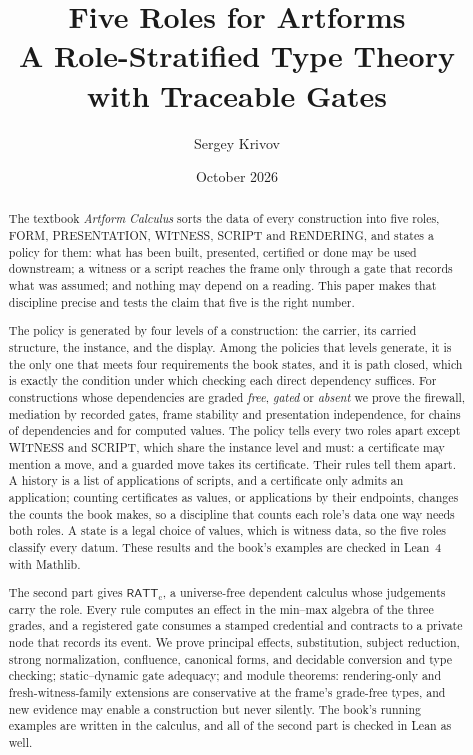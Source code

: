 \documentclass[11pt]{article}
\title{\textbf{Five Roles for Artforms}\\[4pt]
\large A Role-Stratified Type Theory with Traceable Gates}
\author{Sergey Krivov}
\date{October 2026}
\numberwithin{equation}{section}
\theoremstyle{definition}
\theoremstyle{plain}
\theoremstyle{remark}
\newcommand{\RATT}{\mathsf{RATT}_{\mathrm c}}
\newcommand{\FORM}{\textsf{FORM}}
\newcommand{\PRES}{\textsf{PRESENTATION}}
\newcommand{\WIT}{\textsf{WITNESS}}
\newcommand{\SCR}{\textsf{SCRIPT}}
\newcommand{\REN}{\textsf{RENDERING}}
\begin{document}
\maketitle

\begin{abstract}
The textbook \emph{Artform Calculus} sorts the data of every construction
into five roles, \FORM, \PRES, \WIT, \SCR{} and \REN, and states a policy for
them: what has been built, presented, certified or done may be used
downstream; a witness or a script reaches the frame only through a gate that
records what was assumed; and nothing may depend on a reading.  This paper
makes that discipline precise and tests the claim that five is the right
number.

The policy is generated by four levels of a construction: the carrier, its
carried structure, the instance, and the display.  Among the policies that
levels generate, it is the only one that meets four requirements the book
states, and it is path closed, which is
exactly the condition under which checking each direct dependency suffices.
For constructions whose dependencies are graded \emph{free}, \emph{gated} or
\emph{absent} we prove the firewall, mediation by recorded gates, frame
stability and presentation independence, for chains of dependencies and for
computed values.  The policy tells every two roles apart except \WIT{} and
\SCR, which share the instance level and must: a certificate may mention a
move, and a guarded move takes its certificate.  Their rules tell them apart.
A history is a list of applications of scripts, and a certificate only admits
an application; counting certificates as values, or applications by their
endpoints, changes the counts the book makes, so a discipline that counts
each role's data one way needs both roles.  A state is a legal choice of
values, which is witness data, so the five roles classify every datum.  These
results and the book's examples are checked in Lean~4 with Mathlib.

The second part gives \(\RATT\), a universe-free dependent calculus whose
judgements carry the role.  Every rule computes an effect in the min--max
algebra of the three grades, and a registered gate consumes a stamped
credential and contracts to a private node that records its event.  We
prove principal effects, substitution, subject reduction, strong
normalization, confluence, canonical forms, and decidable conversion and type
checking; static--dynamic gate adequacy; and module theorems: rendering-only
and fresh-witness-family extensions are conservative at the frame's
grade-free types, and new evidence may enable a construction but never
silently.  The book's running examples are written in the calculus, and all
of the second part is checked in Lean as well.
\end{abstract}
\end{document}
